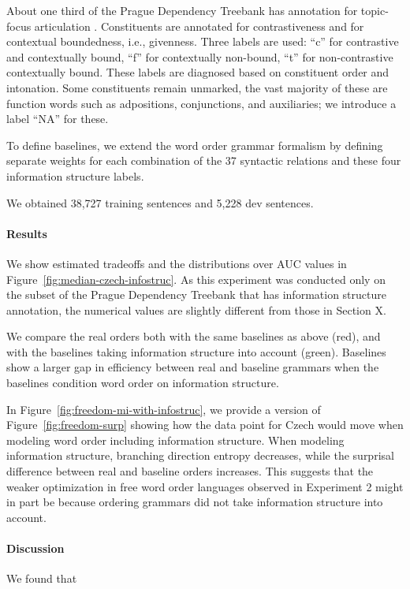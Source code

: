 About one third of the Prague Dependency Treebank has annotation for topic-focus articulation \citep{mikulova2006annotation}.
Constituents are annotated for contrastiveness and for contextual boundedness, i.e., givenness.
Three labels are used:
``c'' for contrastive and contextually bound, ``f'' for contextually non-bound, ``t'' for non-contrastive contextually bound.
These labels are diagnosed based on constituent order and intonation.
Some constituents remain unmarked, the vast majority of these are function words such as adpositions, conjunctions, and auxiliaries; we introduce a label ``NA'' for these.

To define baselines, we extend the word order grammar formalism by defining separate weights for each combination of the 37 syntactic relations and these four information structure labels.

We obtained 38,727 training sentences and 5,228 dev sentences.



\paragraph{Results}

We show estimated tradeoffs and the distributions over AUC values in Figure~\ref{fig:median-czech-infostruc}.
As this experiment was conducted only on the subset of the Prague Dependency Treebank that has information structure annotation, the numerical values are slightly different from those in Section X.

We compare the real orders both with the same baselines as above (red), and with the baselines taking information structure into account (green).
Baselines show a larger gap in efficiency between real and baseline grammars when the baselines condition word order on information structure.




In Figure~\ref{fig:freedom-mi-with-infostruc}, we provide a version of Figure~\ref{fig:freedom-surp} showing how the data point for Czech would move when modeling word order including information structure.
When modeling information structure, branching direction entropy decreases, while the surprisal difference between real and baseline orders increases.
This suggests that the weaker optimization in free word order languages observed in Experiment 2 might in part be because ordering grammars did not take information structure into account.
	
\paragraph{Discussion}
We found that 
	
